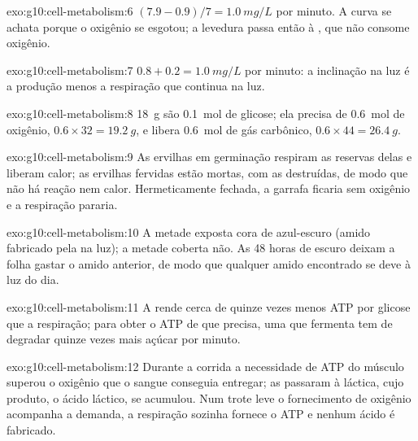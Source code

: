 \begin{solution}{exo:g10:cell-metabolism:6}
$(7.9 - 0.9)/7 = \qty{1.0}{mg/L}$ por minuto. A curva se achata porque
o oxigênio se esgotou; a levedura passa então à , que não
consome oxigênio.
\end{solution}

\begin{solution}{exo:g10:cell-metabolism:7}
$0.8 + 0.2 = \qty{1.0}{mg/L}$ por minuto: a inclinação na luz é a
produção menos a respiração que continua na luz.
\end{solution}

\begin{solution}{exo:g10:cell-metabolism:8}
\qty{18}{g} são \qty{0.1}{mol} de glicose; ela precisa de
\qty{0.6}{mol} de oxigênio, $0.6 \times 32 = \qty{19.2}{g}$, e libera
\qty{0.6}{mol} de gás carbônico, $0.6 \times 44 = \qty{26.4}{g}$.
\end{solution}

\begin{solution}{exo:g10:cell-metabolism:9}
As ervilhas em germinação respiram as reservas delas e liberam calor;
as ervilhas fervidas estão mortas, com as  destruídas, de modo
que não há reação nem calor. Hermeticamente fechada, a garrafa ficaria
sem oxigênio e a respiração pararia.
\end{solution}

\begin{solution}{exo:g10:cell-metabolism:10}
A metade exposta cora de azul-escuro (amido fabricado pela 
na luz); a metade coberta não. As 48 horas de escuro deixam a folha
gastar o amido anterior, de modo que qualquer amido encontrado se deve
à luz do dia.
\end{solution}

\begin{solution}{exo:g10:cell-metabolism:11}
A  rende cerca de quinze vezes menos ATP por glicose que a
respiração; para obter o ATP de que precisa, uma  que fermenta
tem de degradar quinze vezes mais açúcar por minuto.
\end{solution}

\begin{solution}{exo:g10:cell-metabolism:12}
Durante a corrida a necessidade de ATP do músculo superou o oxigênio
que o sangue conseguia entregar; as  passaram à 
láctica, cujo produto, o ácido láctico, se acumulou. Num trote leve o
fornecimento de oxigênio acompanha a demanda, a respiração sozinha
fornece o ATP e nenhum ácido é fabricado.
\end{solution}

